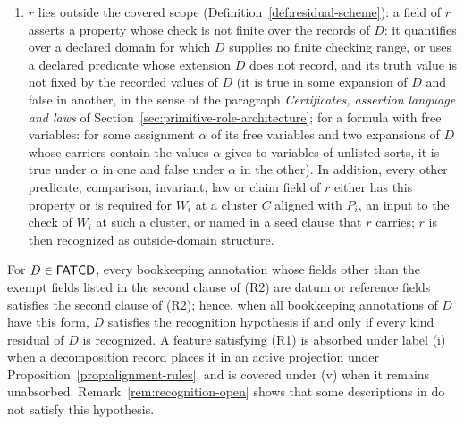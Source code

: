\begin{definition}
\begin{enumerate}[label=(R\arabic*),topsep=2pt,itemsep=1pt]
    as in the running example of Section~\ref{sec:fatcd-domain}). A checked level translation from \(r_j\) to \(r_{j+1}\) is a
    comparison field of \(r_j\) referencing a translation annotation carried
    in \(\Audit{D}\) whose source and target contexts are levels recorded by level annotations whose target fields list \(r_j\) and \(r_{j+1}\), respectively, together with a finite
    bijection \(\beta\) of specified datum fields as above and a correct certificate, recorded true,
    that is such a conjunction of equalities,
    that each value equals its \(\beta\)-image;
  \item \(r\) lies outside the covered scope
    (Definition~\ref{def:residual-scheme}): a field of \(r\) asserts a property whose check is not finite over the records of \(D\): it quantifies over a declared domain for which \(D\) supplies no finite checking range, or uses a declared predicate whose extension \(D\) does not record, and its truth value is not fixed by the recorded values of \(D\) (it is true in some expansion of \(D\) and false in another, in the sense of the paragraph \emph{Certificates, assertion language and laws} of Section~\ref{sec:primitive-role-architecture}; for a formula with free variables: for some assignment \(\alpha\) of its free variables and two expansions of \(D\) whose carriers contain the values \(\alpha\) gives to variables of unlisted sorts, it is true under \(\alpha\) in one and false under \(\alpha\) in the other). In addition, every other predicate, comparison, invariant, law or claim field of \(r\) either has this property or is required for \(W_i\) at a cluster \(C\) aligned with \(P_i\), an input to the check of \(W_i\) at such a cluster, or named in a seed clause that \(r\) carries; \(r\) is then
    recognized as outside-domain structure.
\end{enumerate}
For \(D\in\mathsf{FATCD}{}\), every bookkeeping annotation whose fields other than the
exempt fields listed in the second clause of (R2) are datum or reference fields
satisfies the
second clause of (R2); hence, when all bookkeeping annotations of \(D\) have this
form, \(D\) satisfies the recognition hypothesis if and only if every
kind residual of \(D\) is recognized.
A feature satisfying (R1) is absorbed under label (i) when a decomposition record
places it in an active projection under
Proposition~\ref{prop:alignment-rules}, and is covered under (v) when it
remains unabsorbed. Remark~\ref{rem:recognition-open} shows that some
descriptions in \FATCD{} do not satisfy this hypothesis.
\end{definition}

